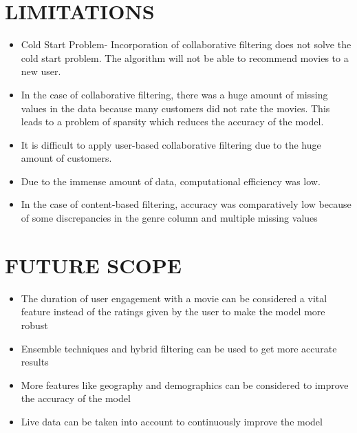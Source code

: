 \documentclass[a4paper,10pt]{article}
\begin{document}
\section{LIMITATIONS}
\begin{itemize}
    \item Cold Start Problem- Incorporation of collaborative filtering does not solve the cold start problem. The algorithm will not be able to recommend movies to a new user.

    \item In the case of collaborative filtering, there was a huge amount of missing values in the data because many customers did not rate the movies. This leads to a problem of sparsity which reduces the accuracy of the model.

    \item It is difficult to apply user-based collaborative filtering due to the huge amount of customers.

    \item Due to the immense amount of data, computational efficiency was low. 

    \item In the case of content-based filtering, accuracy was comparatively low because of some discrepancies in the genre column and multiple missing values  
\end{itemize}


\section{FUTURE SCOPE}
\begin{itemize}
    \item The duration of user engagement with a movie  can be considered a vital feature instead of the ratings given by the user to make the model more robust

    \item Ensemble techniques and hybrid filtering can be used to get more accurate results

    \item More features like geography and demographics can be considered to improve the accuracy of the model

    \item Live data can be taken into account to continuously improve the model

\end{itemize}
\fontsize{8}{9}\selectfont







\clearpage
\end{document}
